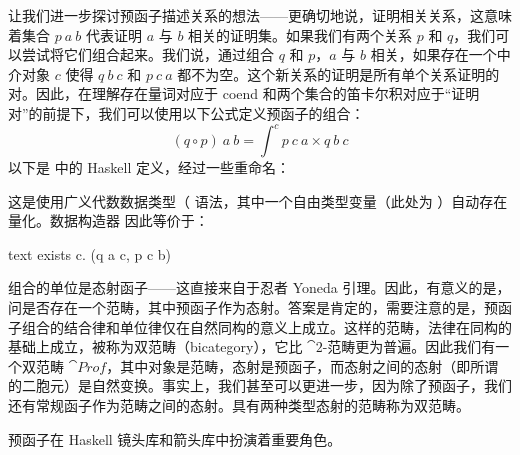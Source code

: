 让我们进一步探讨预函子描述关系的想法——更确切地说，证明相关关系，这意味着集合 $p\ a\ b$ 代表证明 $a$ 与 $b$ 相关的证明集。如果我们有两个关系 $p$ 和 $q$，我们可以尝试将它们组合起来。我们说，通过组合 $q$ 和 $p$，$a$ 与 $b$ 相关，如果存在一个中介对象 $c$ 使得 $q\ b\ c$ 和 $p\ c\ a$ 都不为空。这个新关系的证明是所有单个关系证明的对。因此，在理解存在量词对应于 coend 和两个集合的笛卡尔积对应于“证明对”的前提下，我们可以使用以下公式定义预函子的组合：
\[(q \circ p)\ a\ b = \int^c p\ c\ a\times{}q\ b\ c\]
以下是  中的 Haskell 定义，经过一些重命名：

这是使用广义代数数据类型（ 语法，其中一个自由类型变量（此处为 ）自动存在量化。数据构造器  因此等价于：

\begin{snip}{text}
  exists c. (q a c, p c b)
\end{snip}
组合的单位是态射函子——这直接来自于忍者 Yoneda 引理。因此，有意义的是，问是否存在一个范畴，其中预函子作为态射。答案是肯定的，需要注意的是，预函子组合的结合律和单位律仅在自然同构的意义上成立。这样的范畴，法律在同构的基础上成立，被称为双范畴（bicategory），它比 $\cat{2}$-范畴更为普遍。因此我们有一个双范畴 $\cat{Prof}$，其中对象是范畴，态射是预函子，而态射之间的态射（即所谓的二胞元）是自然变换。事实上，我们甚至可以更进一步，因为除了预函子，我们还有常规函子作为范畴之间的态射。具有两种类型态射的范畴称为双范畴。

预函子在 Haskell 镜头库和箭头库中扮演着重要角色。
